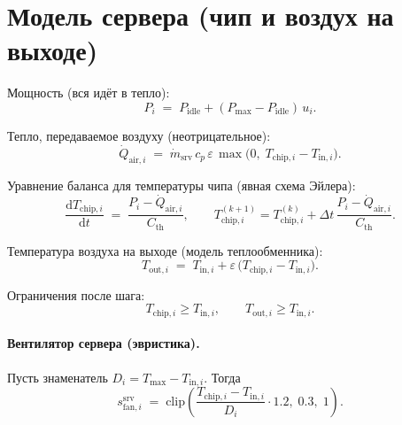 \documentclass[12pt,a4paper]{article}
\begin{document}
\section{Модель сервера (чип и воздух на выходе)}

Мощность (вся идёт в тепло):
\begin{equation}
  P_i \;=\; P_{\mathrm{idle}} + (P_{\mathrm{max}} - P_{\mathrm{idle}})\, u_i .
\end{equation}

Тепло, передаваемое воздуху (неотрицательное):
\begin{equation}
  \dot Q_{\mathrm{air},i} \;=\; \dot m_{\mathrm{srv}}\, c_p\, \varepsilon\, \max\bigl(0,\; T_{\mathrm{chip},i} - T_{\mathrm{in},i}\bigr).
\end{equation}

Уравнение баланса для температуры чипа (явная схема Эйлера):
\begin{equation}
  \frac{\mathrm{d} T_{\mathrm{chip},i}}{\mathrm{d} t}
  \;=\; \frac{P_i - \dot Q_{\mathrm{air},i}}{C_{\mathrm{th}}},
  \qquad
  T_{\mathrm{chip},i}^{(k+1)} = T_{\mathrm{chip},i}^{(k)} + \Delta t\,\frac{P_i - \dot Q_{\mathrm{air},i}}{C_{\mathrm{th}}}.
\end{equation}

Температура воздуха на выходе (модель теплообменника):
\begin{equation}
  T_{\mathrm{out},i} \;=\; T_{\mathrm{in},i} + \varepsilon\,\bigl(T_{\mathrm{chip},i} - T_{\mathrm{in},i}\bigr).
\end{equation}

Ограничения после шага:
\begin{equation}
  T_{\mathrm{chip},i} \ge T_{\mathrm{in},i}, \qquad T_{\mathrm{out},i} \ge T_{\mathrm{in},i}.
\end{equation}

\paragraph{Вентилятор сервера (эвристика).}
Пусть знаменатель $D_i = T_{\max} - T_{\mathrm{in},i}$. Тогда
\begin{equation}
  s_{\mathrm{fan},i}^{\mathrm{srv}} \;=\; \mathrm{clip}\left( \frac{T_{\mathrm{chip},i} - T_{\mathrm{in},i}}{D_i}\cdot 1.2,\; 0.3,\; 1 \right).
\end{equation}
\end{document}
